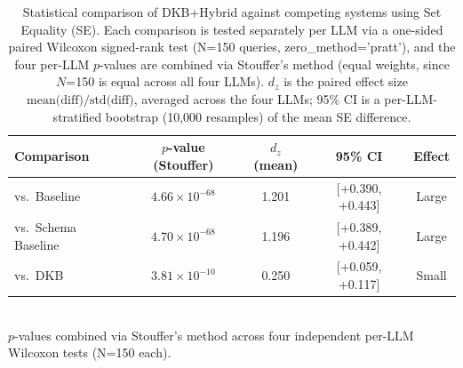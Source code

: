 \begin{table}[t]
\centering
\caption{Statistical comparison of DKB+Hybrid against competing systems using Set Equality (SE). Each comparison is tested separately per LLM via a one-sided paired Wilcoxon signed-rank test (N=150 queries, zero\_method='pratt'), and the four per-LLM $p$-values are combined via Stouffer's method (equal weights, since $N$=150 is equal across all four LLMs). $d_z$ is the paired effect size $\text{mean(diff)}/\text{std(diff)}$, averaged across the four LLMs; 95\% CI is a per-LLM-stratified bootstrap (10,000 resamples) of the mean SE difference.}
\label{tab:stats}
\small
\begin{tabular}{lcccc}
\toprule
\textbf{Comparison} & \textbf{$p$-value (Stouffer)} & \textbf{$d_z$ (mean)} & \textbf{95\% CI} & \textbf{Effect} \\
\midrule
vs.\ Baseline & $4.66\times10^{-68}$ & 1.201 & [+0.390, +0.443] & Large \\
vs.\ Schema Baseline & $4.70\times10^{-68}$ & 1.196 & [+0.389, +0.442] & Large \\
vs.\ DKB & $3.81\times10^{-10}$ & 0.250 & [+0.059, +0.117] & Small \\
\bottomrule
\end{tabular}
\vspace{0.1cm}
\\
\footnotesize{$p$-values combined via Stouffer's method across four independent per-LLM Wilcoxon tests (N=150 each).}
\end{table}
